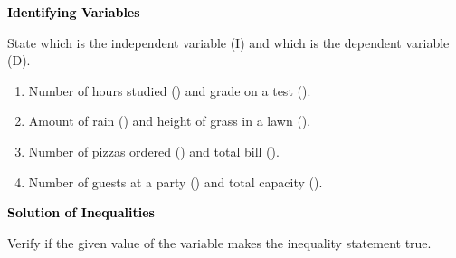 \documentclass[12pt, letterpaper, fleqn]{article}
\newcommand{\blankshorter}{\underline{\hspace{1.5cm}}}
\begin{document}
\newpage

\begin{tcolorbox}[colback=black!10]
\large\textcolor{black}{\textbf{Identifying Variables}}
\end{tcolorbox}

\noindent
State which is the independent variable (I) and which is the dependent variable (D).

\vspace{3mm}

\begin{enumerate}[itemsep=2.2cm, leftmargin=0.6cm]

\item Number of hours studied (\blankshorter) and grade on a test (\blankshorter).

\vspace{2cm}

\item Amount of rain (\blankshorter) and height of grass in a lawn (\blankshorter).

\vspace{2cm}

\item Number of pizzas ordered (\blankshorter) and total bill (\blankshorter).

\vspace{2cm}

\item Number of guests at a party (\blankshorter) and total capacity (\blankshorter).

\vspace{2cm}
\end{enumerate}

\newpage

\begin{tcolorbox}[colback=black!10]
\large\textcolor{black}{\textbf{Solution of Inequalities}}
\end{tcolorbox}

\noindent
Verify if the given value of the variable makes the inequality statement true.

\vspace{3mm}
\end{document}
